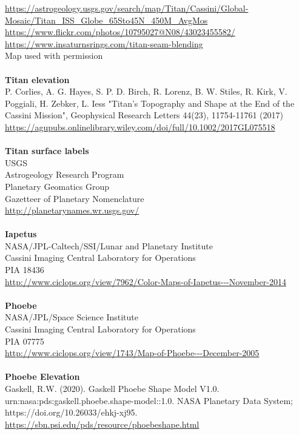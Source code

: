 \documentclass[Orbiter User Manual.tex]{subfiles}
\begin{document}
\url{https://astrogeology.usgs.gov/search/map/Titan/Cassini/Global-Mosaic/Titan_ISS_Globe_65Sto45N_450M_AvgMos}\\
\url{https://www.flickr.com/photos/10795027@N08/43023455582/}\\
\url{https://www.insaturnsrings.com/titan-seam-blending}\\
Map used with permission\\
\\
\textbf{Titan elevation}\\
P. Corlies, A. G. Hayes, S. P. D. Birch, R. Lorenz, B. W. Stiles, R. Kirk, V. Poggiali, H. Zebker, L. Iess "Titan's Topography and Shape at the End of the Cassini Mission", Geophysical Research Letters 44(23), 11754-11761 (2017)\\
\url{https://agupubs.onlinelibrary.wiley.com/doi/full/10.1002/2017GL075518}\\
\\
\textbf{Titan surface labels}\\
USGS\\
Astrogeology Research Program\\
Planetary Geomatics Group\\
Gazetteer of Planetary Nomenclature\\
\url{http://planetarynames.wr.usgs.gov/}\\
\\
\textbf{Iapetus}\\
NASA/JPL-Caltech/SSI/Lunar and Planetary Institute\\
Cassini Imaging Central Laboratory for Operations\\
PIA 18436\\
\url{http://www.ciclops.org/view/7962/Color-Maps-of-Iapetus---November-2014}\\
\\
\textbf{Phoebe}\\
NASA/JPL/Space Science Institute\\
Cassini Imaging Central Laboratory for Operations\\
PIA 07775\\
\url{http://www.ciclops.org/view/1743/Map-of-Phoebe---December-2005}\\
\\
\textbf{Phoebe Elevation}\\
Gaskell, R.W. (2020). Gaskell Phoebe Shape Model V1.0. urn:nasa:pds:gaskell.phoebe.shape-model::1.0. NASA Planetary Data System; https://doi.org/10.26033/ehkj-xj95.
\url{https://sbn.psi.edu/pds/resource/phoebeshape.html}\\
\end{document}
